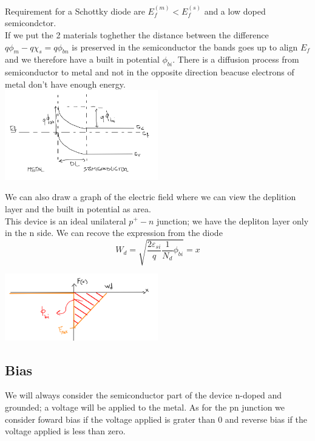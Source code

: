 Requirement for a Schottky diode are $E_f^{(m)}<E_f^{(s)}$ and a low doped semicondctor.\\
If we put the 2 materials toghether the distance between the difference $q\phi_m-q\chi_s=q\phi_{bn}$ is preserved in the semiconductor the bands goes up to align $E_f$ and we therefore have a built in potential $\phi_{bi}$. There is a diffusion process from semiconductor to metal and not in the opposite direction beacuse electrons of metal don't have enough energy.\\

\centering
\includegraphics[width=0.5\textwidth]{ms2.png}\\
\raggedright
  
We can also draw a graph of the electric field where we can view the deplition layer and the built in potential as area.\\
This device is an ideal unilateral $p^+-n$ junction; we have the depliton layer only in the n side. We can recove the expression from the diode   
\begin{equation}
W_d=\sqrt{\frac{2\varepsilon_{si}}{q}\frac{1}{N_d}\phi_{bi}}=x
\end{equation}  

\centering
\includegraphics[width=0.5\textwidth]{ms3.png}\\
\raggedright

\subsection{Bias}
We will always consider the semiconductor part of the device n-doped and grounded; a voltage will be applied to the metal. As for the pn junction we consider foward bias if the voltage applied is grater than 0 and reverse bias if the voltage applied is less than zero.\\


